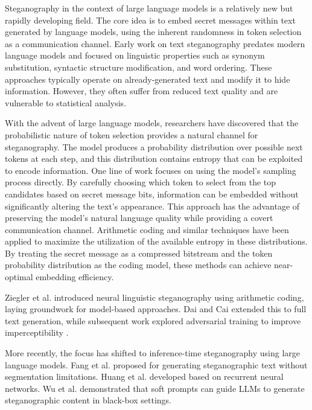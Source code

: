 \documentclass[sigconf,review,anonymous]{acmart}
\begin{document}
Steganography in the context of large language models is a relatively new but rapidly developing field. The core idea is to embed secret messages within text generated by language models, using the inherent randomness in token selection as a communication channel. Early work on text steganography predates modern language models and focused on linguistic properties such as synonym substitution, syntactic structure modification, and word ordering. These approaches typically operate on already-generated text and modify it to hide information. However, they often suffer from reduced text quality and are vulnerable to statistical analysis.

With the advent of large language models, researchers have discovered that the probabilistic nature of token selection provides a natural channel for steganography. The model produces a probability distribution over possible next tokens at each step, and this distribution contains entropy that can be exploited to encode information. One line of work focuses on using the model's sampling process directly. By carefully choosing which token to select from the top candidates based on secret message bits, information can be embedded without significantly altering the text's appearance. This approach has the advantage of preserving the model's natural language quality while providing a covert communication channel. Arithmetic coding and similar techniques have been applied to maximize the utilization of the available entropy in these distributions. By treating the secret message as a compressed bitstream and the token probability distribution as the coding model, these methods can achieve near-optimal embedding efficiency.

Ziegler et al. \cite{ziegler2019neural} introduced neural linguistic steganography using arithmetic coding, laying groundwork for model-based approaches. Dai and Cai \cite{dai2019towards} extended this to full text generation, while subsequent work explored adversarial training to improve imperceptibility \cite{yang2020ganstega}.

More recently, the focus has shifted to inference-time steganography using large language models. Fang et al. \cite{fang2017acads} proposed \textit{} for generating steganographic text without segmentation limitations. Huang et al. \cite{huang2024blinguistic} developed \textit{} based on recurrent neural networks. Wu et al. \cite{wu2024generative} demonstrated that soft prompts can guide LLMs to generate steganographic content in black-box settings.
\end{document}
